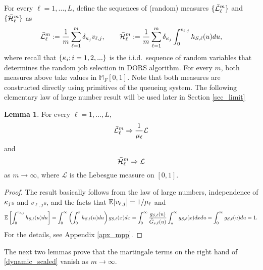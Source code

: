 \documentclass{article}
\theoremstyle{definition}
\newtheorem{lemma}[theorem]{Lemma}
\numberwithin{equation}{section}
\begin{document}
For every $\ell=1,...,L$, define the sequences of (random) measures $\{\bar{\mathcal{L}}_\ell^m\}$ and $\{\bar{\mathcal{H}}_\ell^m\}$ as
\begin{equation}\label{def_kappaMeasure}
  \bar{\mathcal{L}}^m_\ell := \frac{1}{m}\sum_{\ell=1}^{m} \delta_{\kappa_j} v_{\ell,j},\quad\quad \bar{\mathcal{H}}^m_\ell := \frac{1}{m}\sum_{\ell=1}^{m} \delta_{\kappa_j} \int_0^{v_{\ell,j}}h_{S,\ell}(u)du,
\end{equation}
where recall that $\{\kappa_i;i=1,2,...\}$ is the i.i.d.\ sequence of random variables that determines the random job selection in DORS algorithm. For every $m$, both measures above take values in $\mathbb{M}_{F}[0,1]$. Note that both measures are constructed directly using primitives of the queueing system. The following elementary  law of large number result will be used later in Section \ref{sec_limit}




\begin{lemma}\label{lem_llnKappa}
For every $\ell=1,...,L$,
\begin{equation}\label{llnK}
   \bar{\mathcal{L}}^m_\ell \Rightarrow \frac{1}{\mu_\ell}\mathcal{L}
\end{equation}
and
\begin{equation}\label{llnA}
   \bar{\mathcal{H}}^m_\ell \Rightarrow \mathcal{L}
\end{equation}
as $m\to\infty$, where $\mathcal{L}$ is the Lebesgue measure on $[0,1]$.
\end{lemma}
\begin{proof}
  The result basically follows from the law of large numbers, independence of $\kappa_j$s and $v_{\ell,j}$s, and the facts that $\mathbb{E}[v_{\ell,j}]=1/\mu_\ell$ and
  \[\mathbb{E}\left[\int_0^{v_{\ell,j}}h_{S,\ell}(u)du\right]=\int_0^\infty \left(\int_0^xh_{S,\ell}(u)du\right)g_{S,\ell}(x)dx = \int_0^\infty \frac{g_{S,\ell}(u)}{\bar G_{s,\ell}(u)}\int_u^\infty g_{S,\ell}(x)dxdu=\int_0^\infty g_{S,\ell}(u)du=1.\]
  For the details, see Appendix \ref{apx_mpp}.
\end{proof}

The next two lemmas prove that the martingale terms on the right hand of \eqref{dynamic_scaled} vanish as $m\to\infty$.
\end{document}
